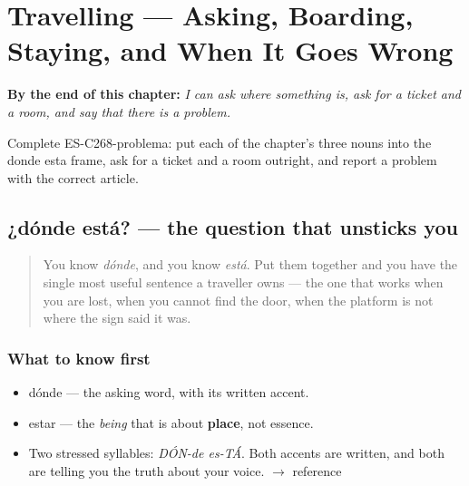 
\chapter{Travelling --- Asking, Boarding, Staying, and When It Goes Wrong}
\label{ch:viajar}

\begin{chapteropening}
\textbf{By the end of this chapter:} \emph{I can ask where something is, ask for a ticket and a room, and say that there is a problem.}

Complete ES-C268-problema: put each of the chapter's three nouns into the donde esta frame, ask for a ticket and a room outright, and report a problem with the correct article.
\end{chapteropening}

\section[¿dónde está?]{¿dónde está? — the question that unsticks you}

\label{lesson:ES-C268-donde-esta}



\begin{quote}
You know \emph{dónde}, and you know \emph{está}. Put them together and you have the single most useful sentence a traveller owns — the one that works when you are lost, when you cannot find the door, when the platform is not where the sign said it was.
\end{quote}

\subsection*{What to know first}
\begin{itemize}
\raggedright
  \item dónde — the asking word, with its written accent.
  \item estar — the \emph{being} that is about \textbf{place}, not essence.
\end{itemize}

\begin{sounds}
\begin{itemize}
\raggedright
  \item Two stressed syllables: \emph{DÓN-de es-TÁ}. Both accents are written, and both are telling you the truth about your voice. $\to$ reference
\end{itemize}
\end{sounds}

